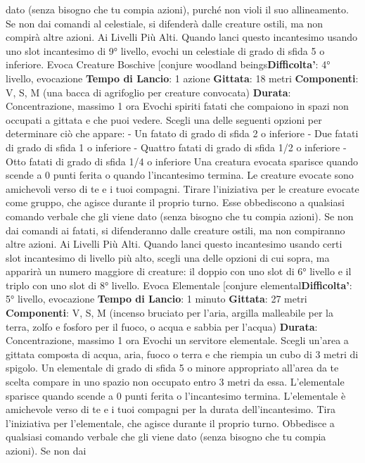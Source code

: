 \begin{multicols}{2}
dato (senza bisogno che tu compia azioni), purché non
violi il suo allineamento. Se non dai comandi al
celestiale, si difenderà dalle creature ostili, ma non
compirà altre azioni.
Ai Livelli Più Alti. Quando lanci questo incantesimo
usando uno slot incantesimo di 9° livello, evochi un
celestiale di grado di sfida 5 o inferiore.
Evoca Creature Boschive
[conjure woodland beings\textbf{Difficolta'}:
4° livello, evocazione
\textbf{Tempo di Lancio}: 1 azione
\textbf{Gittata}: 18 metri
\textbf{Componenti}: V, S, M (una bacca di agrifoglio per
creature convocata)
\textbf{Durata}: Concentrazione, massimo 1 ora
Evochi spiriti fatati che compaiono in spazi non occupati
a gittata e che puoi vedere. Scegli una delle seguenti
opzioni per determinare ciò che appare:
- Un fatato di grado di sfida 2 o inferiore
- Due fatati di grado di sfida 1 o inferiore
- Quattro fatati di grado di sfida 1/2 o inferiore
- Otto fatati di grado di sfida 1/4 o inferiore
Una creatura evocata sparisce quando scende a 0 punti
ferita o quando l’incantesimo termina.
Le creature evocate sono amichevoli verso di te e i tuoi
compagni. Tirare l’iniziativa per le creature evocate
come gruppo, che agisce durante il proprio turno. Esse
obbediscono a qualsiasi comando verbale che gli viene
dato (senza bisogno che tu compia azioni). Se non dai
comandi ai fatati, si difenderanno dalle creature ostili,
ma non compiranno altre azioni.
Ai Livelli Più Alti. Quando lanci questo incantesimo
usando certi slot incantesimo di livello più alto, scegli
una delle opzioni di cui sopra, ma apparirà un numero
maggiore di creature: il doppio con uno slot di 6° livello
e il triplo con uno slot di 8° livello.
Evoca Elementale
[conjure elemental\textbf{Difficolta'}:
5° livello, evocazione
\textbf{Tempo di Lancio}: 1 minuto
\textbf{Gittata}: 27 metri
\textbf{Componenti}: V, S, M (incenso bruciato per l’aria,
argilla malleabile per la terra, zolfo e fosforo per il
fuoco, o acqua e sabbia per l’acqua)
\textbf{Durata}: Concentrazione, massimo 1 ora
Evochi un servitore elementale. Scegli un’area a gittata
composta di acqua, aria, fuoco o terra e che riempia un
cubo di 3 metri di spigolo. Un elementale di grado di
sfida 5 o minore appropriato all’area da te scelta
compare in uno spazio non occupato entro 3 metri da
essa. L’elementale sparisce quando scende a 0 punti
ferita o l’incantesimo termina.
L’elementale è amichevole verso di te e i tuoi compagni
per la durata dell’incantesimo. Tira l’iniziativa per
l’elementale, che agisce durante il proprio turno.
Obbedisce a qualsiasi comando verbale che gli viene
dato (senza bisogno che tu compia azioni). Se non dai

\end{multicols}
